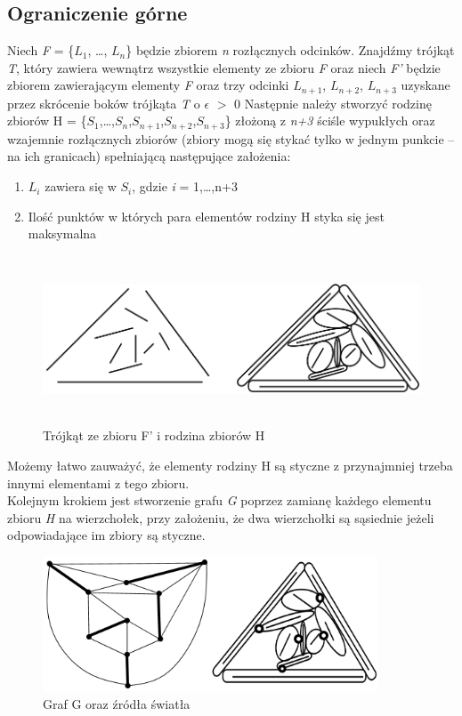 \documentclass[brudnopis]{xmgr}
\begin{document}
\subsection{Ograniczenie górne}
\indent Niech \textit{F} = \{$L_1$, \ldots, $L_n$\} będzie zbiorem \textit{n} rozłącznych odcinków. Znajdźmy trójkąt \textit{T}, który zawiera wewnątrz wszystkie elementy ze zbioru \textit{F} oraz niech \textit{F'} będzie zbiorem zawierającym elementy \textit{F} oraz trzy odcinki $L_{n+1}$, $L_{n+2}$, $L_{n+3}$ uzyskane przez skrócenie boków trójkąta \textit{T} o $\epsilon$ $>$ 0
Następnie należy stworzyć rodzinę zbiorów H = \{$S_1$,\ldots,$S_n$,$S_{n+1}$,$S_{n+2}$,$S_{n+3}$\} złożoną z \textit{n+3} ściśle wypukłych oraz wzajemnie rozłącznych zbiorów (zbiory mogą się stykać tylko w jednym punkcie -- na ich granicach) spełniającą następujące założenia:
\begin{enumerate}
  \item $L_i$ zawiera się w $S_i$, gdzie \textit{i} = 1,\ldots,n+3
  \item Ilość punktów w których para elementów rodziny H styka się jest maksymalna
\end{enumerate}
\begin{figure}[ht!]
 \centering
  \includegraphics[height=5cm, width=13.5cm]{rysunki/podswietlenie.png}
  \caption{Trójkąt ze zbioru F' i rodzina zbiorów H}
\end{figure} 
Możemy łatwo zauważyć, że elementy rodziny H są styczne z przynajmniej trzeba innymi elementami z tego zbioru. 
\\Kolejnym krokiem jest stworzenie grafu \textit{G} poprzez zamianę każdego elementu zbioru \textit{H} na wierzchołek, przy założeniu, że dwa wierzchołki są sąsiednie jeżeli odpowiadające im zbiory są styczne.
\begin{figure}[ht!]
 \centering
  \includegraphics[height=4cm]{rysunki/skojarzenia_zrodla_swiatla.png}
  \caption{Graf G oraz źródła światła}
\end{figure}
\end{document}
